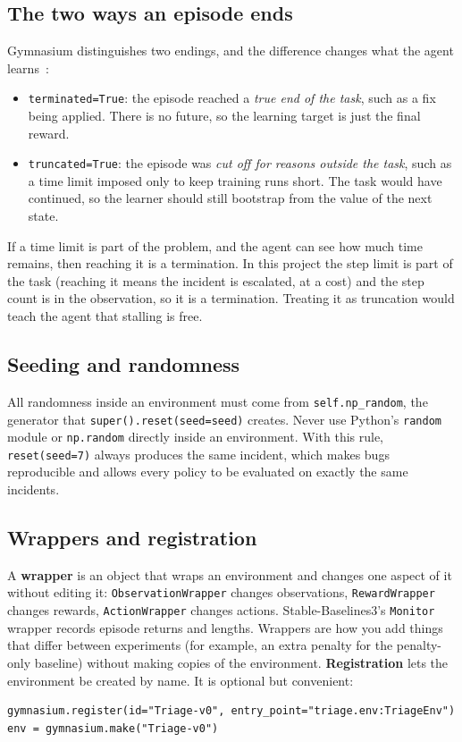 \documentclass[11pt,a4paper]{article}
\begin{document}
\subsection{The two ways an episode ends}
\label{sec:endings}
Gymnasium distinguishes two endings, and the difference changes what the agent learns~\cite{pardo}:
\begin{itemize}
  \item \texttt{terminated=True}: the episode reached a \emph{true end of the task}, such as a fix being applied. There is no future, so the learning target is just the final reward.
  \item \texttt{truncated=True}: the episode was \emph{cut off for reasons outside the task}, such as a time limit imposed only to keep training runs short. The task would have continued, so the learner should still bootstrap from the value of the next state.
\end{itemize}
If a time limit is part of the problem, and the agent can see how much time remains, then reaching it is a termination. In this project the step limit is part of the task (reaching it means the incident is escalated, at a cost) and the step count is in the observation, so it is a termination. Treating it as truncation would teach the agent that stalling is free.

\subsection{Seeding and randomness}
All randomness inside an environment must come from \texttt{self.np\_random}, the generator that \texttt{super().reset(seed=seed)} creates. Never use Python's \texttt{random} module or \texttt{np.random} directly inside an environment. With this rule, \texttt{reset(seed=7)} always produces the same incident, which makes bugs reproducible and allows every policy to be evaluated on exactly the same incidents.

\subsection{Wrappers and registration}
A \textbf{wrapper} is an object that wraps an environment and changes one aspect of it without editing it: \texttt{ObservationWrapper} changes observations, \texttt{RewardWrapper} changes rewards, \texttt{ActionWrapper} changes actions. Stable-Baselines3's \texttt{Monitor} wrapper records episode returns and lengths. Wrappers are how you add things that differ between experiments (for example, an extra penalty for the penalty-only baseline) without making copies of the environment. \textbf{Registration} lets the environment be created by name. It is optional but convenient:
\begin{lstlisting}[numbers=none]
gymnasium.register(id="Triage-v0", entry_point="triage.env:TriageEnv")
env = gymnasium.make("Triage-v0")
\end{lstlisting}
\end{document}
